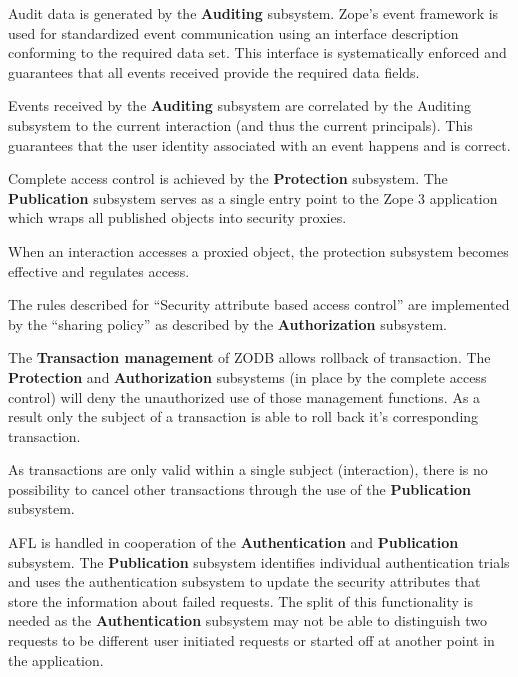 \documentclass[12pt,english]{scrbook}
\begin{document}

Audit data is generated by the \textbf{Auditing} subsystem. Zope's event
framework is used for standardized event communication using an interface
description conforming to the required data set. This interface is
systematically enforced and guarantees that all events received provide the
required data fields.


Events received by the \textbf{Auditing} subsystem are correlated by the
Auditing subsystem to the current interaction (and thus the current
principals). This guarantees that the user identity associated with an event
happens and is correct.


Complete access control is achieved by the \textbf{Protection} subsystem. The
\textbf{Publication} subsystem serves as a single entry point to the Zope 3
application which wraps all published objects into security proxies.

When an interaction accesses a proxied object, the protection subsystem
becomes effective and regulates access.


The rules described for ``Security attribute based access control'' are
implemented by the ``sharing policy'' as described by the
\textbf{Authorization} subsystem.


The \textbf{Transaction management} of ZODB allows rollback of transaction. The
\textbf{Protection} and \textbf{Authorization} subsystems (in place by the
complete access control) will deny the unauthorized use of those management
functions. As a result only the subject of a transaction is able to roll back
it's corresponding transaction.

As transactions are only valid within a single subject (interaction), there is no
possibility to cancel other transactions through the use of the
\textbf{Publication} subsystem.


AFL is handled in cooperation of the \textbf{Authentication} and
\textbf{Publication} subsystem. The \textbf{Publication} subsystem identifies
individual authentication trials and uses the authentication subsystem to
update the security attributes that store the information about failed
requests. The split of this functionality is needed as the
\textbf{Authentication} subsystem may not be able to distinguish two requests
to be different user initiated requests or started off at another point in the
application.
\end{document}
